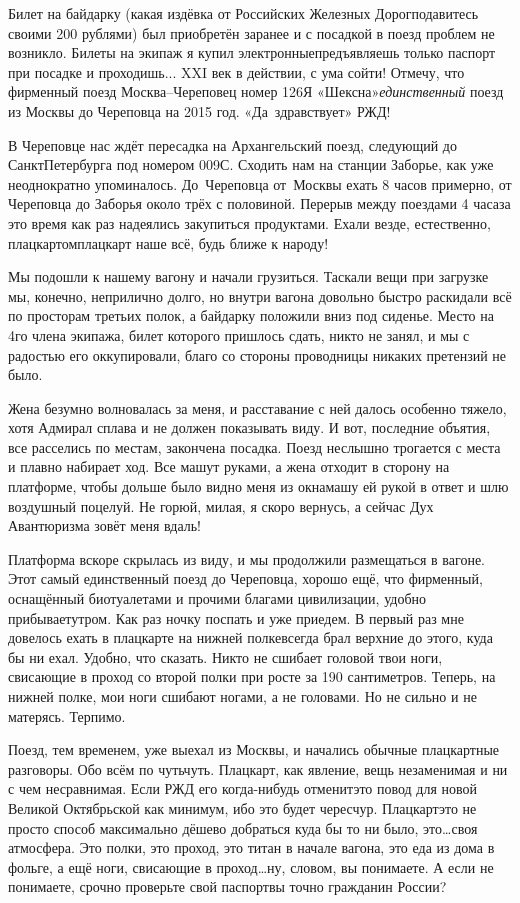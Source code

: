 Билет на байдарку (какая издёвка от Российских Железных Дорог\mdash подавитесь своими 200 рублями) был приобретён заранее и с посадкой в поезд проблем не возникло. Билеты на экипаж я купил электронные\mdash предъявляешь только паспорт при посадке и проходишь... XXI век в действии, с ума сойти! Отмечу, что фирменный поезд Москва\nobreakdash--Череповец номер 126Я «Шексна»\mdash \textit{единственный} поезд из Москвы до Череповца на 2015 год. «Да~здравствует» РЖД!
 
В Череповце нас ждёт пересадка на Архангельский поезд, следующий до Санкт\sdash Петербурга под номером 009С. Сходить нам на станции Заборье, как уже неоднократно упоминалось. До~Череповца от~Москвы ехать 8 часов примерно, от Череповца до Заборья около трёх с половиной. Перерыв между поездами 4 часа\mdash за это время как раз надеялись закупиться продуктами. Ехали везде, естественно, плацкартом\mdash плацкарт наше всё, будь ближе к народу! 

Мы подошли к нашему вагону и начали грузиться. Таскали вещи при загрузке мы, конечно, неприлично долго, но внутри вагона довольно быстро раскидали всё по просторам третьих полок, а байдарку положили вниз под сиденье. Место на 4\sdash го члена экипажа, билет которого пришлось сдать, никто не занял, и мы с радостью его оккупировали, благо со стороны проводницы никаких претензий не было.

Жена безумно волновалась за меня, и расставание с ней далось особенно тяжело, хотя Адмирал сплава и не должен показывать виду. И вот, последние объятия, все расселись по местам, закончена посадка. Поезд неслышно трогается с места и плавно набирает ход. Все машут руками, а жена отходит в сторону на платформе, чтобы дольше было видно меня из окна\mdash машу ей рукой в ответ и шлю воздушный поцелуй. Не горюй, милая, я скоро вернусь, а сейчас Дух Авантюризма зовёт меня вдаль!

Платформа вскоре скрылась из виду, и мы продолжили размещаться в вагоне. Этот самый единственный поезд до Череповца, хорошо ещё, что фирменный, оснащённый биотуалетами и прочими благами цивилизации, удобно прибывает\mdash утром. Как раз ночку поспать и уже приедем. В первый раз мне довелось ехать в плацкарте на нижней полке\mdash всегда брал верхние до этого, куда бы ни ехал. Удобно, что сказать. Никто не сшибает головой твои ноги, свисающие в проход со второй полки при росте за 190 сантиметров. Теперь, на нижней полке, мои ноги сшибают ногами, а не головами. Но не сильно и не матерясь. Терпимо. 

Поезд, тем временем, уже выехал из Москвы, и начались обычные плацкартные разговоры.  Обо всём по чуть\sdash чуть. Плацкарт, как явление, вещь незаменимая и ни с чем несравнимая. Если РЖД его когда-нибудь отменит\mdash это повод для новой Великой Октябрьской как минимум, ибо это будет чересчур. Плацкарт\mdash это не просто способ максимально дёшево добраться куда бы то ни было, это\ldots своя атмосфера. Это полки, это проход, это титан в начале вагона, это еда из дома в фольге, а ещё ноги, свисающие в проход\ldots ну, словом, вы понимаете. А если не понимаете, срочно проверьте свой паспорт\mdash вы точно гражданин России? 

